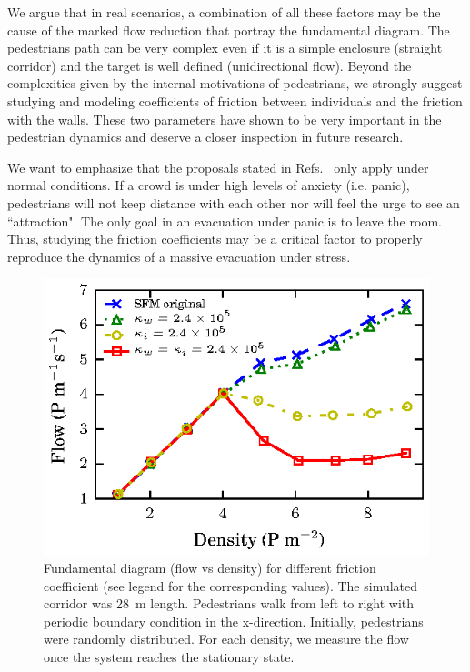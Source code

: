 We argue that in real scenarios, a combination of all these factors may be the cause of the marked flow reduction that portray the fundamental diagram. The pedestrians path can be very complex even if it is a simple enclosure (straight corridor) and the target is well defined (unidirectional flow). Beyond the complexities given by the internal motivations of pedestrians, we strongly suggest studying and modeling coefficients of friction between individuals and the friction with the walls. These two parameters have shown to be very important in the pedestrian dynamics and deserve a closer inspection in future research. 

We want to emphasize that the proposals stated in Refs.~\cite{parisi2,johansson,kwak}  only apply under normal conditions. If a crowd is under high levels of anxiety (i.e. panic), pedestrians will not keep distance with each other nor will feel the urge to see an ``attraction". The only goal in an evacuation under panic is to leave the room. Thus, studying the friction coefficients may be a critical factor to properly reproduce the dynamics of a massive evacuation under stress.


\begin{figure}[htbp!]
\includegraphics[width=\columnwidth]
{plots/flow-density_pasillo22m_fgmodified_multi.eps}
\caption{\label{fgmodified-w22} Fundamental diagram (flow vs density) for different friction coefficient (see legend for the corresponding values). The simulated corridor was 28~m length. Pedestrians walk from left to right with periodic boundary condition in the x-direction. Initially, pedestrians were randomly distributed. For each density, we measure the flow once the system reaches the stationary state.}
\end{figure}


